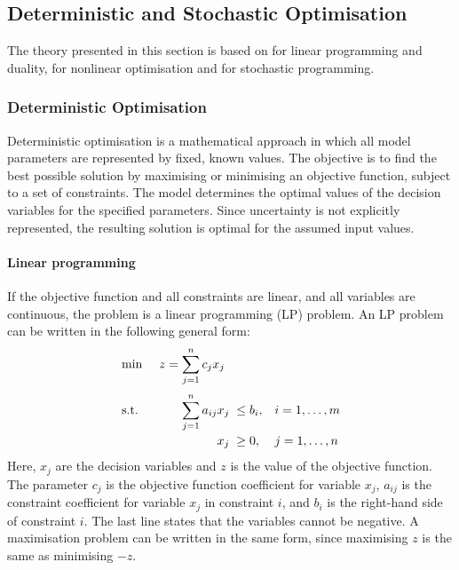 \subsection{Deterministic and Stochastic Optimisation}
\label{subsec:theory_det_stoch}

The theory presented in this section is based on \textcite{lundgren2010} for linear programming and duality, \textcite{boydVandenberghe2004} for nonlinear optimisation and \textcite{birgeLouveaux2011} for stochastic programming.

\subsubsection{Deterministic Optimisation}
\label{subsec:deterministic_optimisation}

Deterministic optimisation is a mathematical approach in which all model parameters are represented by fixed, known values. The objective is to find the best possible solution by maximising or minimising an objective function, subject to a set of constraints. The model determines the optimal values of the decision variables for the specified parameters. Since uncertainty is not explicitly represented, the resulting solution is optimal for the assumed input values.

\paragraph{Linear programming}

If the objective function and all constraints are linear, and all
variables are continuous, the problem is a linear programming (LP)
problem. An LP problem can be written in the following
general form:
\begin{equation}
\begin{array}{@{}l@{\hspace{3.2em}}l@{\;\;}l@{\quad}l@{}}
\min & \llap{$z={}$}{\displaystyle\sum_{j=1}^{n}}\, c_j x_j & & \\[4ex]
\text{s.t.} & {\displaystyle\sum_{j=1}^{n}}\, a_{ij} x_j & \le b_i, & i = 1,\ldots,m\\[3ex]
 & \multicolumn{1}{r@{\;\;}}{x_j} & \ge 0, & j = 1,\ldots,n
\end{array}
\label{eq:lp_general}
\end{equation}
Here, $x_j$ are the decision variables and $z$ is the value of the
objective function. The parameter $c_j$ is the objective function
coefficient for variable $x_j$, $a_{ij}$ is the constraint coefficient
for variable $x_j$ in constraint $i$, and $b_i$ is the right-hand side
of constraint $i$. The last line states that the variables cannot be
negative. A maximisation problem can be written in the same form, since
maximising $z$ is the same as minimising $-z$.

